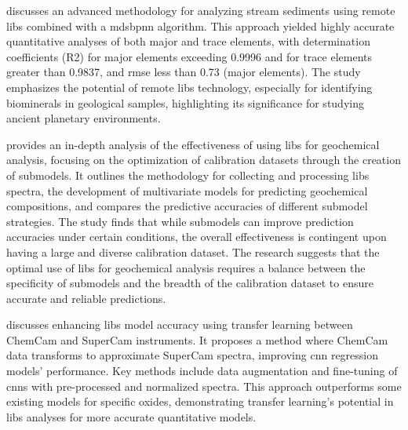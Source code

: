 \citet{wangDeterminationElementalComposition2023} discusses an advanced methodology for analyzing stream sediments using remote \gls{libs} combined with a \gls{mdsbpnn} algorithm.
This approach yielded highly accurate quantitative analyses of both major and trace elements, with determination coefficients (R2) for major elements exceeding 0.9996 and for trace elements greater than 0.9837, and \gls{rmse} less than 0.73 (major elements).
The study emphasizes the potential of remote \gls{libs} technology, especially for identifying biominerals in geological samples, highlighting its significance for studying ancient planetary environments.

\citet{leporeQuantitativePredictionAccuracies2022a} provides an in-depth analysis of the effectiveness of using \gls{libs} for geochemical analysis, focusing on the optimization of calibration datasets through the creation of submodels.
It outlines the methodology for collecting and processing \gls{libs} spectra, the development of multivariate models for predicting geochemical compositions, and compares the predictive accuracies of different submodel strategies.
The study finds that while submodels can improve prediction accuracies under certain conditions, the overall effectiveness is contingent upon having a large and diverse calibration dataset.
The research suggests that the optimal use of \gls{libs} for geochemical analysis requires a balance between the specificity of submodels and the breadth of the calibration dataset to ensure accurate and reliable predictions.

\citet{kepesImprovingLaserinducedBreakdown2022} discusses enhancing \gls{libs} model accuracy using transfer learning between ChemCam and SuperCam instruments.
It proposes a method where ChemCam data transforms to approximate SuperCam spectra, improving \gls{cnn} regression models' performance.
Key methods include data augmentation and fine-tuning of \gls{cnn}s with pre-processed and normalized spectra.
This approach outperforms some existing models for specific oxides, demonstrating transfer learning's potential in \gls{libs} analyses for more accurate quantitative models.

